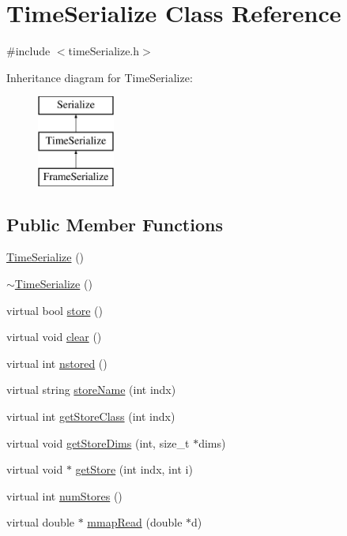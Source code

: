 \hypertarget{classTimeSerialize}{\section{Time\-Serialize Class Reference}
\label{classTimeSerialize}
}


{\ttfamily \#include $<$time\-Serialize.\-h$>$}

Inheritance diagram for Time\-Serialize\-:\begin{figure}[H]
\begin{center}
\leavevmode
\includegraphics[height=3.000000cm]{classTimeSerialize}
\end{center}
\end{figure}
\subsection*{Public Member Functions}
\begin{DoxyCompactItemize}
\item 
\hyperlink{classTimeSerialize_ae7880f4e7d36aebd66c5efa14622439c}{Time\-Serialize} ()
\item 
\hyperlink{classTimeSerialize_a8134ab931baed7946fe9b8a63e696361}{$\sim$\-Time\-Serialize} ()
\item 
virtual bool \hyperlink{classTimeSerialize_a5fa3f8491cf69cafb608ed06d16b744b}{store} ()
\item 
virtual void \hyperlink{classTimeSerialize_a2dc0323aaec9735cec278fce2ab70779}{clear} ()
\item 
virtual int \hyperlink{classTimeSerialize_a8decf0dd155f7c185d5ed4a96ad8df6e}{nstored} ()
\item 
virtual string \hyperlink{classTimeSerialize_aee9a422ba150037d03eaac84f98bb74a}{store\-Name} (int indx)
\item 
virtual int \hyperlink{classTimeSerialize_aabe62de35575d2e543c1b6a60adee905}{get\-Store\-Class} (int indx)
\item 
virtual void \hyperlink{classTimeSerialize_a012cef4eb5d7766296987d57dcd7b6d1}{get\-Store\-Dims} (int, size\-\_\-t $\ast$dims)
\item 
virtual void $\ast$ \hyperlink{classTimeSerialize_aca830871918f9acf615366df5e1eeb11}{get\-Store} (int indx, int i)
\item 
virtual int \hyperlink{classTimeSerialize_af36ff5a97baec0656b91373b72796a5f}{num\-Stores} ()
\item 
virtual double $\ast$ \hyperlink{classTimeSerialize_ac7a17bf484eb4e7970532b6a1ed65325}{mmap\-Read} (double $\ast$d)
\end{DoxyCompactItemize}
